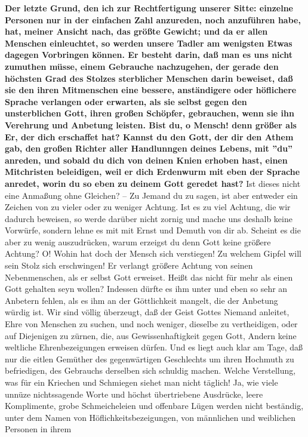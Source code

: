 \textbf{Der letzte Grund, den ich zur Rechtfertigung unserer Sitte: einzelne Personen
nur in der einfachen Zahl anzureden, noch anzuführen habe, hat, meiner Ansicht
nach, das größte Gewicht; und da er allen Menschen einleuchtet, so werden unsere
Tadler am wenigsten Etwas dagegen Vorbringen können. Er besteht darin, daß man
es uns nicht zumuthen müsse, einem Gebrauche nachzugehen, der gerade den
höchsten Grad des Stolzes sterblicher Menschen darin beweiset, daß sie den ihren
Mitmenschen eine bessere, anständigere oder höflichere Sprache verlangen oder
erwarten, als sie selbst gegen den unsterblichen Gott, ihren großen Schöpfer,
gebrauchen, wenn sie ihn Verehrung und Anbetung leisten. Bist du, o Mensch! denn
größer als Er, der dich erschaffet hat? Kannst du den Gott, der dir den Athem
gab, den großen Richter aller Handlunngen deines Lebens, mit ''du'' anreden, und
sobald du dich von deinen Knien erhoben hast, einen Mitchristen beleidigen, weil
er dich Erdenwurm mit eben der Sprache anredet, worin du so eben zu deinem Gott
geredet hast?} Ist dieses nicht eine Anmaßung ohne Gleichen? -- Zu Jemand du zu
sagen, ist aber entweder ein Zeichen von zu vieler oder zu weniger Achtung. Ist
es zu viel Achtung, die wir dadurch beweisen, so werde darüber nicht zornig und
mache uns deshalb keine Vorwürfe, sondern lehne es mit mit Ernst und Demuth von
dir ab. Scheint es die aber zu wenig auszudrücken, warum erzeigst du denn Gott
keine größere Achtung? O! Wohin hat doch der Mensch sich verstiegen! Zu welchem
Gipfel will sein Stolz sich erschwingen! Er verlangt größere Achtung von seinen
Nebenmenschen, als er selbst Gott erweiset. Heißt das nicht für mehr als einen
Gott gehalten seyn wollen? Indessen dürfte es ihm unter und eben so sehr an
Anbetern fehlen, als es ihm an der Göttlichkeit mangelt, die der Anbetung würdig
ist. Wir sind völlig überzeugt, daß der Geist Gottes Niemand anleitet, Ehre von
Menschen zu suchen, und noch weniger, dieselbe zu vertheidigen, oder auf
Diejenigen zu zürnen, die, aus Gewissenhaftigkeit gegen Gott, Andern keine
weltliche Ehrenbezeigungen erweisen dürfen. Und es liegt auch klar am Tage, daß
nur die eitlen Gemüther des gegenwärtigen Geschlechts um ihren Hochmuth zu
befriedigen, des Gebrauchs derselben sich schuldig machen. Welche Verstellung,
was für ein Kriechen und Schmiegen siehet man nicht täglich! Ja, wie viele
unnüze nichtssagende Worte und höchst übertriebene Ausdrücke, leere Komplimente,
grobe Schmeicheleien und offenbare Lügen werden nicht beständig, unter dem Namen
von Höflichkeitsbezeigungen, von männlichen und weiblichen Personen in ihrem
